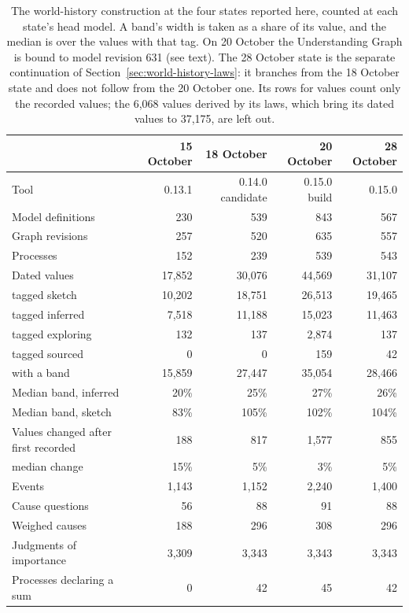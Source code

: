\documentclass[11pt,a4paper]{article}
\begin{document}
\begin{table}[htbp]
\centering
\small
\begin{tabular}{lrrrr}
\toprule
 & 15 October & 18 October & 20 October & 28 October \\
\midrule
Tool & 0.13.1 & 0.14.0 candidate & 0.15.0 build & 0.15.0 \\
Model definitions & 230 & 539 & 843 & 567 \\
Graph revisions & 257 & 520 & 635 & 557 \\
Processes & 152 & 239 & 539 & 543 \\
Dated values & 17,852 & 30,076 & 44,569 & 31,107 \\
\quad tagged sketch & 10,202 & 18,751 & 26,513 & 19,465 \\
\quad tagged inferred & 7,518 & 11,188 & 15,023 & 11,463 \\
\quad tagged exploring & 132 & 137 & 2,874 & 137 \\
\quad tagged sourced & 0 & 0 & 159 & 42 \\
\quad with a band & 15,859 & 27,447 & 35,054 & 28,466 \\
Median band, inferred & 20\% & 25\% & 27\% & 26\% \\
Median band, sketch & 83\% & 105\% & 102\% & 104\% \\
Values changed after first recorded & 188 & 817 & 1,577 & 855 \\
\quad median change & 15\% & 5\% & 3\% & 5\% \\
Events & 1,143 & 1,152 & 2,240 & 1,400 \\
Cause questions & 56 & 88 & 91 & 88 \\
Weighed causes & 188 & 296 & 308 & 296 \\
Judgments of importance & 3,309 & 3,343 & 3,343 & 3,343 \\
Processes declaring a sum & 0 & 42 & 45 & 42 \\
\bottomrule
\end{tabular}
\caption{The world-history construction at the four states reported here, counted at each state's head model. A
band's width is taken as a share of its value, and the median is over the values with that tag. On 20 October the
Understanding Graph is bound to model revision 631 (see text). The 28 October state is the separate continuation of
Section~\ref{sec:world-history-laws}: it branches from the 18 October state and does not follow from the 20 October
one. Its rows for values count only the recorded values; the 6,068 values derived by its laws, which bring its dated
values to 37,175, are left out.}
\label{tab:world-history-states}
\end{table}
\end{document}
